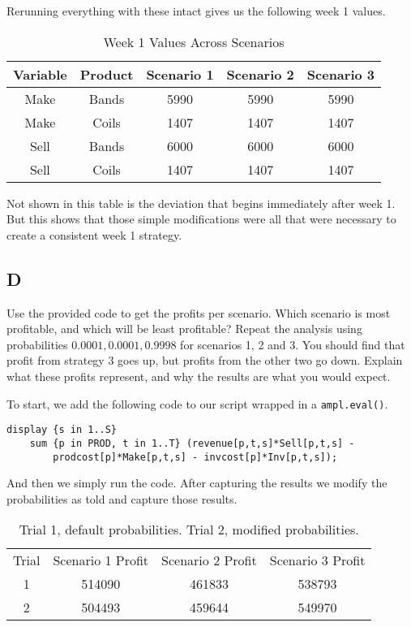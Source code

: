 Rerunning everything with these intact gives us the following week 1 values.

\begin{table}[ht!]
	\centering
	\begin{tabular}{|c|c|ccc|}
		\hline
		Variable & Product & Scenario 1  & Scenario 2 & Scenario 3 \\
		\hline
		Make & Bands & 5990 & 5990 & 5990 \\
		Make & Coils & 1407 & 1407 & 1407 \\
		Sell & Bands & 6000 & 6000 & 6000 \\
		Sell & Coils & 1407 & 1407 & 1407 \\
		\hline
	\end{tabular}
	\caption{Week 1 Values Across Scenarios}
\end{table}

Not shown in this table is the deviation that begins immediately after week 1. But this shows that those simple modifications were all that were necessary to create a consistent week 1 strategy.

\subsection*{D}

\prob

Use the provided code to get the profits per scenario. Which scenario is most profitable, and which will be least profitable? Repeat the analysis using probabilities $0.0001, 0.0001, 0.9998$ for scenarios 1, 2 and 3. You should find that profit from strategy 3 goes up, but profits from the other two go down. Explain what these profits represent, and why the results are what you would expect.

\sol

To start, we add the following code to our script wrapped in a \texttt{ampl.eval()}.

\begin{lstlisting}
display {s in 1..S}
    sum {p in PROD, t in 1..T} (revenue[p,t,s]*Sell[p,t,s] -
        prodcost[p]*Make[p,t,s] - invcost[p]*Inv[p,t,s]);
\end{lstlisting}

And then we simply run the code. After capturing the results we modify the probabilities as told and capture those results.

\begin{table}[!ht]
	\centering
	\begin{tabular}{|c|ccc|}
		\hline
		Trial & Scenario 1 Profit & Scenario 2 Profit & Scenario 3 Profit \\
		1 & 514090 & 461833 & 538793 \\
		2 & 504493 & 459644 & 549970 \\
		\hline
	\end{tabular}
	\caption{Trial 1, default probabilities. Trial 2, modified probabilities.}
	\label{tab:<+label+>}
\end{table}

